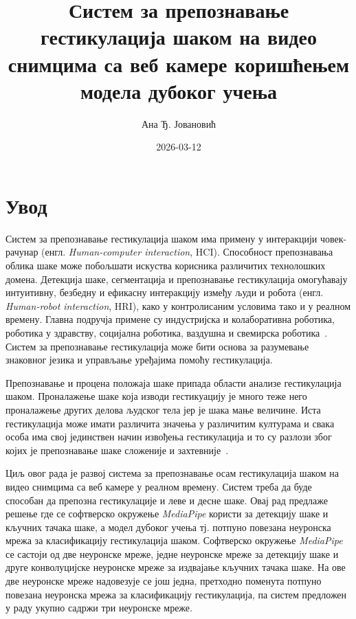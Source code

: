 \documentclass[master]{finthesis}
\title{Систем за препознавање гестикулација шаком на видео снимцима са веб камере коришћењем модела дубоког учења}
\author{Ана Ђ. Јовановић}
\date{2026-03-12}
\begin{document}
\maketitle

\tableofcontents

\makeabstract

\section{Увод}

Систем за препознавање гестикулација шаком има примену у интеракцији човек-рачунар (енгл. \textit{Human-computer interaction}, HCI). Способност препознавања облика шаке може побољшати искуства корисника различитих технолошких домена. Детекција шаке, сегментација и препознавање гестикулација омогућавају интуитивну, безбедну и ефикасну интеракцију између људи и робота (енгл. \textit{Human-robot interaction}, HRI), како у контролисаним условима тако и у реалном времену. Главна подручја примене су индустријска и колаборативна роботика, роботика у здравству, социјална роботика, ваздушна и свемирска роботика~\cite{JALAYER2026103110}. Систем за препознавање гестикулација може бити основа за разумевање знаковног језика и управљање уређајима помоћу гестикулација.

Препознавање и процена положаја шаке припада области анализе гестикулација шаком. Проналажење шаке која изводи гестикуацију је много теже него проналажење других делова људског тела јер је шака мање величине. Иста гестикулација може имати различита значења у различитим културама и свака особа има свој јединствен начин извођења гестикулација и то су разлози због којих је препознавање шаке сложеније и захтевније~\cite{10.1007/s00371-023-03160-x}.  

Циљ овог рада је развој система за препознавање осам гестикулација шаком на видео снимцима са веб камере у реалном времену. Систем треба да буде способан да препозна гестикулације и леве и десне шаке. Овај рад предлаже решење где се софтверско окружење \textit{MediaPipe} користи за детекцију шаке и кључних тачака шаке, а модел дубоког учења тј. потпуно повезана неуронска мрежа за класификацију гестикулација шаком. Софтверско окружење \textit{MediaPipe} се састоји од две неуронске мреже, једне неуронске мреже за детекцију шаке и друге конволуцијске неуронске мреже за издвајање кључних тачака шаке. На ове две неуронске мреже надовезује се још једна, претходно поменута потпуно повезана неуронска мрежа за класификацију гестикулација, па систем предложен у раду укупно садржи три неуронске мреже. 
\end{document}
